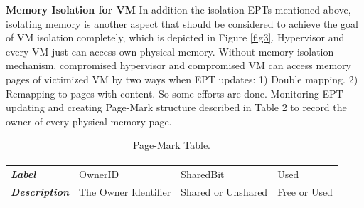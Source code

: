 \documentclass[conference]{IEEEtran}
\begin{document}
\textbf{Memory Isolation for VM }
In addition the isolation EPTs mentioned above, isolating memory is another aspect that should be considered to achieve the goal of VM isolation completely, which is depicted in Figure \ref{fig3}. 
Hypervisor and every VM just can access own physical memory. Without memory isolation mechanism, compromised hypervisor and compromised VM can access memory pages of victimized VM by two ways when EPT updates: 1) Double mapping. 2) Remapping to pages with content. So some efforts are done. Monitoring EPT updating and creating Page-Mark structure described in Table 2 to record the owner of every physical memory page. 

\begin{table}
\centering
\caption{Page-Mark Table.}\label{tab2}
\begin{tabular}{p{1.2cm}|p{1.4cm}|p{1.2cm}|p{1.5cm}}
\hline
\multicolumn{4}{c}{\bfseries\textbf\centering{Page-Mark Table}}\\
\hline
{\itshape\bfseries Label} & OwnerID & SharedBit & Used \\
\hline
{\itshape\bfseries Description} & The Owner Identifier & Shared or Unshared & Free or Used \\
\hline
\end{tabular}
\end{table}
\end{document}
